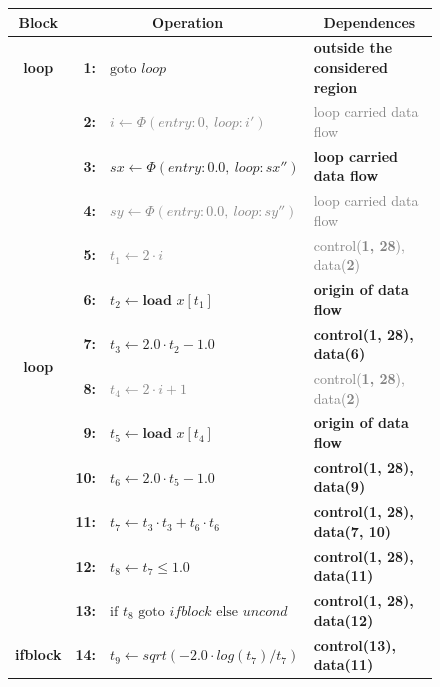 \begin{figure}[p]
\centering
\begin{tabular}{|c|rl|l|}
\hline
\multicolumn{1}{|c}{\bf Block} &  \multicolumn{2}{|c|}{\bf Operation} & \multicolumn{1}{c|}{\bf Dependences} \\
\hline
\hline
\multirow{1}{*}{\bf loop}
  & {\bf 1:} & \textcolor{color_strings}{$\text{goto }loop$}&\textcolor{color_strings}{\bf outside the considered region}\\
\hline
\multirow{12}{*}{\bf loop}
  & {\bf  2:} & \textcolor{gray}{$i\leftarrow \Phi(entry:0,\ loop:i')$}&\textcolor{gray}{loop carried data flow}\\[-1.7mm]
  & {\bf  3:} & \textcolor{color_types}{$sx\leftarrow \Phi(entry:0.0,\ loop:sx'')$}&\textcolor{color_types}{\bf loop carried data flow}\\[-1.7mm]
  & {\bf  4:} & \textcolor{gray}{$sy\leftarrow \Phi(entry:0.0,\ loop:sy'')$}&\textcolor{gray}{loop carried data flow}\\[-1.7mm]
  & {\bf  5:} & \textcolor{gray}{$t_1\leftarrow 2\cdot i$}&\textcolor{gray}{control({\bf 1, 28}), data({\bf 2})}\\[-1.7mm]
  & {\bf  6:} & \textcolor{color_types}{$t_2\leftarrow\textbf{load }x[t_1]$}&\textcolor{color_types}{\bf origin of data flow}\\[-1.7mm]
  & {\bf  7:} & $t_3\leftarrow 2.0\cdot t_2-1.0$&{\bf control({\bf 1, 28}), data({\bf 6})}\\[-1.7mm]
  & {\bf  8:} & \textcolor{gray}{$t_4\leftarrow 2\cdot i+1$}&\textcolor{gray}{control({\bf 1, 28}), data({\bf 2})}\\[-1.7mm]
  & {\bf  9:} & \textcolor{color_types}{$t_5\leftarrow\textbf{load }x[t_4]$}&\textcolor{color_types}{\bf origin of data flow}\\[-1.7mm]
  & {\bf 10:} & $t_6\leftarrow 2.0\cdot t_5-1.0$&{\bf control({\bf 1, 28}), data({\bf 9})}\\[-1.7mm]
  & {\bf 11:} & $t_7\leftarrow t_3\cdot t_3+t_6\cdot t_6$&{\bf control({\bf 1, 28}), data({\bf 7, 10})}\\[-1.7mm]
  & {\bf 12:} & $t_8\leftarrow t_7\leq1.0$&{\bf control({\bf 1, 28}), data({\bf 11})}\\[-1.7mm]
  & {\bf 13:} & $\text{if }t_8\text{ goto }ifblock\text{ else }uncond$&{\bf control({\bf 1, 28}), data({\bf 12})}\\
\hline
\multirow{10}{*}{\bf ifblock}
 & {\bf 14:} & $t_9\leftarrow sqrt(-2.0\cdot log(t_7) / t_7)$&{\bf control({\bf 13}), data({\bf 11})}\\[-1.7mm]

\end{tabular}
\end{figure}
